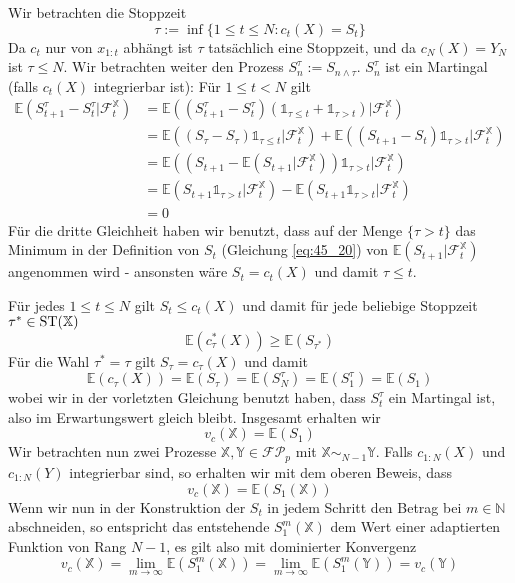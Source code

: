 \begin{example}
\begin{enumerate}
         Wir betrachten die Stoppzeit 
         $$\tau := \inf\{ 1\leq t\leq N: c_t(X) = S_t\}$$ 
         Da $c_t$ nur von $x_{1:t}$ abhängt ist $\tau$ tatsächlich eine Stoppzeit, und da $c_N(X)=Y_N$ ist $\tau \leq N$. Wir betrachten weiter den Prozess $S^\tau_n:=S_{n\wedge \tau}$. $S^\tau_n$ ist ein Martingal (falls $c_t(X)$ integrierbar ist): Für $1\leq t< N$ gilt 
         \begin{align*}
            \mathbb{E}(S^\tau_{t+1}-S^\tau_t \vert \mathcal{F}^\mathbb{X}_t) &= \mathbb{E}((S^\tau_{t+1} - S^\tau_t)(\mathds{1}_{\tau \leq t} + \mathds{1}_{\tau > t})\vert \mathcal{F}^\mathbb{X}_t) \\
            &= \mathbb{E}((S_\tau-S_\tau)\mathds{1}_{\tau\leq t} \vert \mathcal{F}^\mathbb{X}_t) + \mathbb{E}((S_{t+1} - S_t ) \mathds{1}_{\tau > t} \vert \mathcal{F}^\mathbb{X}_t) \\
            &= \mathbb{E}\left((S_{t+1} - \mathbb{E}(S_{t+1} \vert \mathcal{F}^\mathbb{X}_t))\mathds{1}_{\tau>t} \vert \mathcal{F}^\mathbb{X}_t\right) \\
            &= \mathbb{E}(S_{t+1}\mathds{1}_{\tau>t} \vert \mathcal{F}^\mathbb{X}_t) - \mathbb{E}(S_{t+1} \mathds{1}_{\tau>t} \vert \mathcal{F}^\mathbb{X}_t) \\
            &= 0
         \end{align*}
         Für die dritte Gleichheit haben wir benutzt, dass auf der Menge $\{\tau > t\}$ das Minimum in der Definition von $S_t$ (Gleichung \ref{eq:45_20}) von $\mathbb{E}(S_{t+1} \vert \mathcal{F}_t^\mathbb{X})$ angenommen wird - ansonsten wäre $S_t=c_t(X)$ und damit $\tau \leq t$.

        Für jedes $1 \leq t \leq N$ gilt $S_t \leq c_t(X)$ und damit für jede beliebige Stoppzeit $\tau^* \in \operatorname{ST}(\mathbb{X})$
        $$\mathbb{E}(c_\tau^*(X)) \geq \mathbb{E}(S_{\tau^*})$$
        Für die Wahl $\tau^*=\tau$ gilt $S_\tau = c_\tau(X)$ und damit
        $$\mathbb{E}(c_\tau(X)) = \mathbb{E}(S_\tau) = \mathbb{E}(S_N^\tau) = \mathbb{E}(S_1^\tau) = \mathbb{E}(S_1)$$
        wobei wir in der vorletzten Gleichung benutzt haben, dass $S_t^\tau$ ein Martingal ist, also im Erwartungswert gleich bleibt. Insgesamt erhalten wir 
        $$v_c(\mathbb{X}) = \mathbb{E}(S_1)$$
        Wir betrachten nun zwei Prozesse $\mathbb{X,Y} \in \mathcal{FP}_p$ mit $\mathbb{X} \sim_{N-1} \mathbb{Y}$. Falls $c_{1:N}(X)$ und $c_{1:N}(Y)$ integrierbar sind, so erhalten wir mit dem oberen Beweis, dass 
        $$v_c(\mathbb{X}) = \mathbb{E}(S_1(\mathbb{X}))$$
        Wenn wir nun in der Konstruktion der $S_t$ in jedem Schritt den Betrag bei $m \in \mathbb{N}$ abschneiden, so entspricht das entstehende $S_1^m(\mathbb{X})$ dem Wert einer adaptierten Funktion von Rang $N-1$, es gilt also mit dominierter Konvergenz
        $$v_c(\mathbb{X}) = \lim_{m\rightarrow \infty} \mathbb{E}(S_1^m(\mathbb{X})) = \lim_{m\rightarrow \infty} \mathbb{E}(S_1^m(\mathbb{Y})) = v_c(\mathbb{Y})$$

    \end{enumerate}

\end{example}
